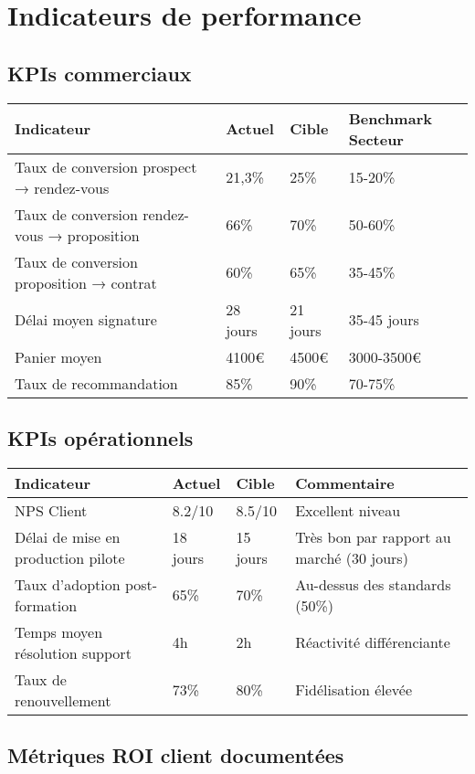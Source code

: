 \section{Indicateurs de performance}

\subsection{KPIs commerciaux}

\begin{longtable}{@{}p{5cm}p{3cm}p{3cm}p{3cm}@{}}
\toprule
\textbf{Indicateur} & \textbf{Actuel} & \textbf{Cible} & \textbf{Benchmark Secteur} \\
\midrule
Taux de conversion prospect → rendez-vous & 21,3\% & 25\% & 15-20\% \\
Taux de conversion rendez-vous → proposition & 66\% & 70\% & 50-60\% \\
Taux de conversion proposition → contrat & 60\% & 65\% & 35-45\% \\
Délai moyen signature & 28 jours & 21 jours & 35-45 jours \\
Panier moyen & 4100€ & 4500€ & 3000-3500€ \\
Taux de recommandation & 85\% & 90\% & 70-75\% \\
\bottomrule
\end{longtable}

\subsection{KPIs opérationnels}

\begin{longtable}{@{}p{5cm}p{3cm}p{3cm}p{3cm}@{}}
\toprule
\textbf{Indicateur} & \textbf{Actuel} & \textbf{Cible} & \textbf{Commentaire} \\
\midrule
NPS Client & 8.2/10 & 8.5/10 & Excellent niveau \\
Délai de mise en production pilote & 18 jours & 15 jours & Très bon par rapport au marché (30 jours) \\
Taux d'adoption post-formation & 65\% & 70\% & Au-dessus des standards (50\%) \\
Temps moyen résolution support & 4h & 2h & Réactivité différenciante \\
Taux de renouvellement & 73\% & 80\% & Fidélisation élevée \\
\bottomrule
\end{longtable}

\subsection{Métriques ROI client documentées}

